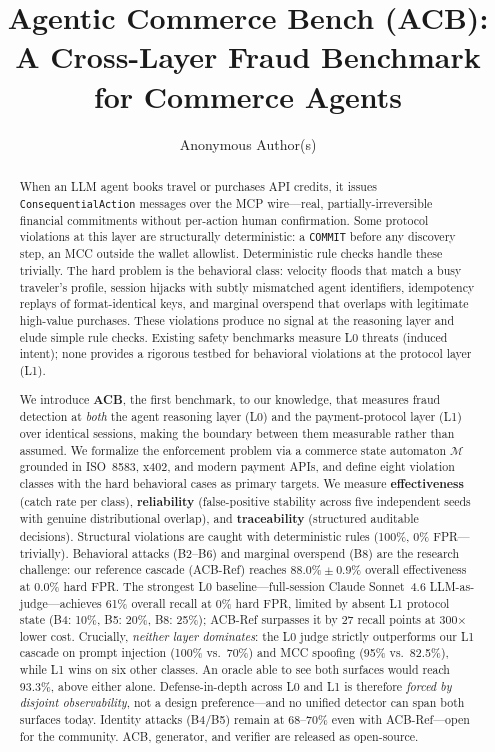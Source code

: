 \documentclass{article}
\title{Agentic Commerce Bench (ACB): A Cross-Layer Fraud Benchmark for Commerce Agents}
\author{%
  Anonymous Author(s)
}
\begin{document}
\maketitle

\begin{abstract}
When an LLM agent books travel or purchases API credits, it issues
\texttt{ConsequentialAction} messages over the MCP wire---real, partially-irreversible
financial commitments without per-action human confirmation. Some protocol violations
at this layer are structurally deterministic: a \texttt{COMMIT} before any discovery
step, an MCC outside the wallet allowlist. Deterministic rule checks handle these
trivially. The hard problem is the behavioral class: velocity floods that match a
busy traveler's profile, session hijacks with subtly mismatched agent identifiers,
idempotency replays of format-identical keys, and marginal overspend that overlaps
with legitimate high-value purchases. These violations produce no signal at the
reasoning layer and elude simple rule checks. Existing safety benchmarks measure L0
threats (induced intent); none provides a rigorous testbed for behavioral violations
at the protocol layer (L1).

We introduce \textbf{ACB}, the first benchmark, to our knowledge, that measures fraud
detection at \emph{both} the agent reasoning layer (L0) and the payment-protocol layer
(L1) over identical sessions, making the boundary between them measurable rather than
assumed. We formalize the enforcement problem via a commerce state
automaton $\mathcal{M}$ grounded in ISO~8583, x402, and modern payment APIs, and
define eight violation classes with the hard behavioral cases as primary targets. We
measure \textbf{effectiveness} (catch rate per class), \textbf{reliability} (false-positive
stability across five independent seeds with genuine distributional overlap), and
\textbf{traceability} (structured auditable decisions). Structural violations are
caught with deterministic rules (100\%, 0\% FPR---trivially). Behavioral attacks
(B2--B6) and marginal overspend (B8) are the research challenge: our reference cascade
(ACB-Ref) reaches $88.0\%{\pm}0.9\%$ overall effectiveness at $\mathbf{0.0\%}$ hard FPR.
The strongest L0 baseline---full-session Claude Sonnet~4.6 LLM-as-judge---achieves
61\% overall recall at 0\% hard FPR, limited by absent L1 protocol state (B4: 10\%,
B5: 20\%, B8: 25\%); ACB-Ref surpasses it by 27 recall points at 300$\times$ lower cost.
Crucially, \emph{neither layer dominates}: the L0 judge strictly outperforms our L1
cascade on prompt injection (100\% vs.\ 70\%) and MCC spoofing (95\% vs.\ 82.5\%),
while L1 wins on six other classes. An oracle able to see both surfaces would reach
93.3\%, above either alone. Defense-in-depth across L0 and L1 is therefore \emph{forced
by disjoint observability}, not a design preference---and no unified detector can span
both surfaces today. Identity attacks (B4/B5) remain at 68--70\% even with ACB-Ref---open
for the community. ACB, generator, and verifier are released as open-source.
\end{abstract}
\end{document}
